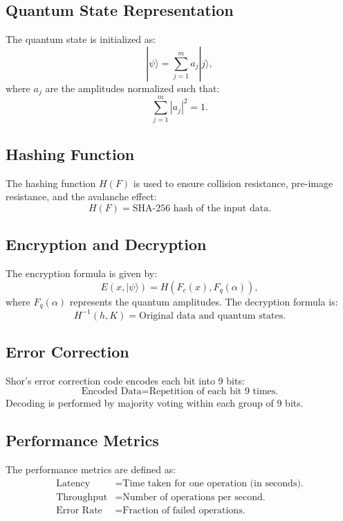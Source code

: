 \documentclass{article}
\theoremstyle{plain}
\begin{document}
\begin{itemize}
\begin{itemize}
\subsection{Quantum State Representation}
The quantum state is initialized as:
\begin{equation}
|\psi\rangle = \sum_{j=1}^m a_j |j\rangle,
\end{equation}
where $a_j$ are the amplitudes normalized such that:
\begin{equation}
\sum_{j=1}^m |a_j|^2 = 1.
\end{equation}

\subsection{Hashing Function}
The hashing function $H(F)$ is used to ensure collision resistance, pre-image resistance, and the avalanche effect:
\begin{equation}
H(F) = \text{SHA-256 hash of the input data.}
\end{equation}

\subsection{Encryption and Decryption}
The encryption formula is given by:
\begin{equation}
E(x, |\psi\rangle) = H(F_c(x), F_q(\alpha)),
\end{equation}
where $F_q(\alpha)$ represents the quantum amplitudes. The decryption formula is:
\begin{equation}
H^{-1}(h, K) = \text{Original data and quantum states.}
\end{equation}

\subsection{Error Correction}
Shor's error correction code encodes each bit into 9 bits:
\begin{equation}
\text{Encoded Data} = \text{Repetition of each bit 9 times.}
\end{equation}
Decoding is performed by majority voting within each group of 9 bits.

\subsection{Performance Metrics}
The performance metrics are defined as:
\begin{align}
\text{Latency} &= \text{Time taken for one operation (in seconds).} \\
\text{Throughput} &= \text{Number of operations per second.} \\
\text{Error Rate} &= \text{Fraction of failed operations.}
\end{align}


\end{itemize}
\end{itemize}
\end{document}
